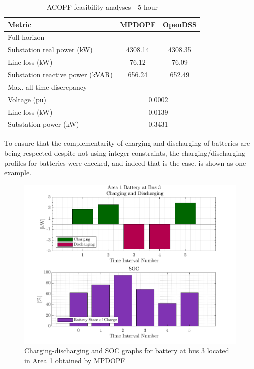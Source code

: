 \documentclass[../../outputs/main.tex]{subfiles}
\begin{document}
\begin{table}[H]
    \centering
    \caption{ACOPF feasibility analyses - $5$ hour}
    \begin{tabular}{|l|c|c|}
    \hline
    \textbf{Metric} & \textbf{MPDOPF} & \textbf{OpenDSS} \\ \hline
    Full horizon  & \multicolumn{2}{c|}{} \\ \hline
    \quad Substation real power (kW) & 4308.14 & 4308.35 \\ \hline
    \quad Line loss (kW) & 76.12 & 76.09 \\ \hline
    \quad Substation reactive power (kVAR) & 656.24 & 652.49 \\ \hline
    Max. all-time discrepancy & \multicolumn{2}{c|}{} \\ \hline
    \quad Voltage (pu) & \multicolumn{2}{c|}{0.0002} \\ \hline
    \quad Line loss (kW) & \multicolumn{2}{c|}{0.0139} \\ \hline
    \quad Substation power (kW) & \multicolumn{2}{c|}{0.3431} \\ \hline
    \end{tabular}
    \label{table:feas-5-20-30}
    \vspace{-3mm}
\end{table}

To ensure that the complementarity of charging and discharging of batteries are being respected despite not using integer constraints, the charging/discharging profiles for batteries were checked, and indeed that is the case.  is shown as one example.

\begin{figure}[t]
    \centering
    \includegraphics[width=\linewidth]{../figures/T5-pv20-batt30-genCost/dopf/BatteryPlots/macroItr_5_genCost_Battery_1_alpha_0.001.png}
    \vspace{-5mm}
    \caption{Charging-discharging and SOC graphs for battery at bus 3 located in Area 1 obtained by MPDOPF}
    \label{fig:batt-plot-dopf-5-20-30-genCost}
    \vspace{-3mm}
\end{figure}
\end{document}
